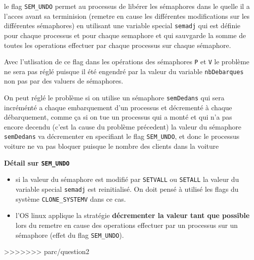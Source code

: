 le flag \texttt{SEM\_UNDO} permet au processus de libérer les sémaphores dans le
quelle il a l'acces avant sa terminision  (remetre en cause les
différentes modifications sur les différentes sémaphores) en utilisant une variable special
\texttt{semadj} qui est définie pour chaque processus et pour chaque semaphore
et qui sauvgarde la somme de toutes les operations effectuer par chaque
processus sur chaque sémaphore.

Avec l'utlisation de ce flag dans les opérations des sémaphores
\texttt{P} et \texttt{V} le problème ne sera pas réglé puisque il été
engendré par la valeur du variable \texttt{nbDebarques} non pas par des valuers
de sémaphores.

On peut réglé le problème si on utilise un sémaphore \texttt{semDedans} qui sera
incréménté a chaque embarquement d'un processus et décrementé à chaque
débarquement, comme ça si on tue un processus qui a monté et qui n'a pas encore
decendu (c'est la cause du problème précedent) la valeur du sémaphore
\texttt{semDedans} va décrementer en specifiant le flag \texttt{SEM\_UNDO}, et
donc le processus voiture ne va pas bloquer puisque le nombre des clients dans
la voiture 

\textbf{Détail sur \texttt{SEM\_UNDO}}

\begin{itemize}
\item
  si la valeur du sémaphore est modifié par \texttt{SETVALL} ou \texttt{SETALL} la
  valeur du variable special \texttt{semadj} est reinitialisé. On doit pensé à
  utilisé les flags du système \texttt{CLONE\_SYSTEMV} dans ce cas.\\

\item
  l'OS linux applique la stratégie \textbf{décrementer la valeur tant que possible} lors du
  remetre en cause des operations effectuer par un processus sur un sémaphore
  (effet du flag \texttt{SEM\_UNDO}).
\end{itemize}
>>>>>>> parc/question2

